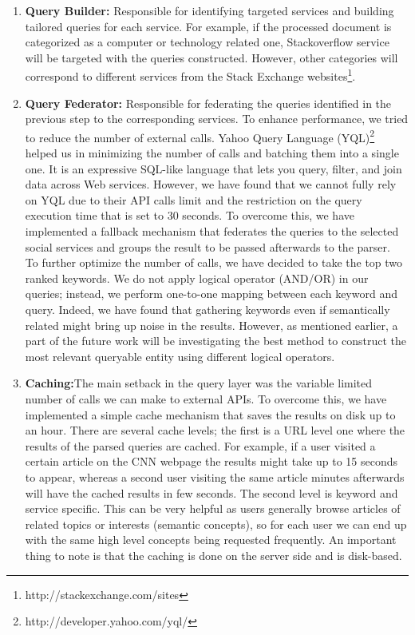 \documentclass[oribibl]{llncs}
\begin{document}
\begin{enumerate}
\item {\bf Query Builder:} Responsible for identifying targeted services and building tailored queries for each service. For example, if the processed document is categorized as a computer or technology related one, Stackoverflow service will be targeted with the queries constructed. However, other categories will correspond to different services from the Stack Exchange websites\footnote{http://stackexchange.com/sites}.
\item {\bf Query Federator:} Responsible for federating the queries identified in the previous step to the corresponding services. To enhance performance, we tried to reduce the number of external calls. Yahoo Query Language (YQL)\footnote{http://developer.yahoo.com/yql/} helped us in minimizing the number of calls and batching them into a single one. It is an expressive SQL-like language that lets you query, filter, and join data across Web services. However, we have found that we cannot fully rely on YQL due to their API calls limit and the restriction on the query execution time that is set to 30 seconds. To overcome this, we have implemented a fallback mechanism that federates the queries to the selected social services and groups the result to be passed afterwards to the parser. \\
To further optimize the number of calls, we have decided to take the top two ranked keywords. We do not apply logical operator (AND/OR) in our queries; instead, we perform one-to-one mapping between each keyword and query. Indeed, we have found that gathering keywords even if semantically related might bring up noise in the results. However, as mentioned earlier, a part of the future work will be investigating the best method to construct the most relevant queryable entity using different logical operators.
\item {\bf Caching:}The main setback in the query layer was the variable limited number of calls we can make to external APIs. To overcome this, we have implemented a simple cache mechanism that saves the results on disk up to an hour. There are several cache levels; the first is a URL level one where the results of the parsed queries are cached. For example, if a user visited a certain article on the CNN webpage the results might take up to 15 seconds to appear, whereas a second user visiting the same article minutes afterwards will have the cached results in few seconds. The second level is keyword and service specific. This can be very helpful as users generally browse articles of related topics or interests (semantic concepts), so for each user we can end up with the same high level concepts being requested frequently. An important thing to note is that the caching is done on the server side and is disk-based.
\end{enumerate}
\end{document}
